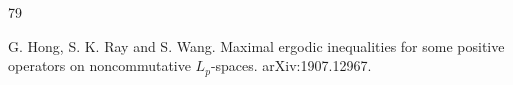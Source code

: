 \documentclass[leqno]{article} %
\numberwithin{equation}{section}
\begin{document}
\begin{thebibliography}{79}





 




G. Hong, S. K. Ray and S. Wang.
\newblock Maximal ergodic inequalities for some positive operators on  noncommutative $L_p$-spaces.
\newblock arXiv:1907.12967.


\end{thebibliography}
\end{document}
